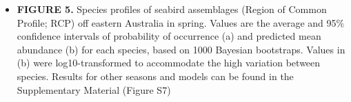 \documentclass{article}
\begin{document}
\begin{linenumbers}
\begin{itemize}
\item
  \textbf{FIGURE 5.} Species profiles of seabird assemblages (Region of Common Profile; RCP) off eastern Australia in spring. Values are the average and 95\% confidence intervals of probability of occurrence (a) and predicted mean abundance (b) for each species, based on 1000 Bayesian bootstraps. Values in (b) were log10-transformed to accommodate the high variation between species. Results for other seasons and models can be found in the Supplementary Material (Figure S7)
\end{itemize}

\end{linenumbers}

\begin{landscape}

\begin{table}


\end{table}
\end{landscape}
\end{document}
